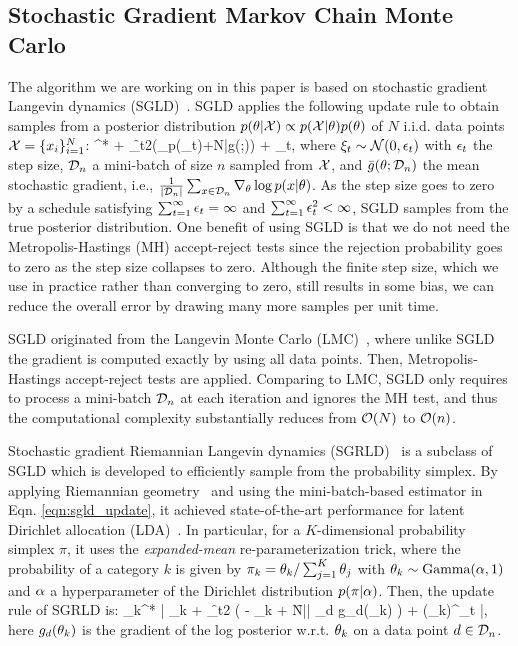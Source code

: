 \subsection{Stochastic Gradient Markov Chain Monte Carlo}
The algorithm we are working on in this paper is based on stochastic gradient Langevin dynamics (SGLD)~\cite{welling2011bayesian}. SGLD applies the following update rule to obtain samples from a posterior distribution $p(\ta|\cX) \propto p(\cX|\ta) p(\ta)$ of $N$ i.i.d. data points $\cX=\{x_i\}_{i=1}^{N}$:
\bea
\ta^* \law \ta + \f{\epsilon_t}{2}\left(\nabla_{\ta}\log p(\ta_t)+N\bar{g}(\ta;\SGLDMinibatch)\right) + \xi_t, \label{eqn:sgld_update}
\eea
where $\xi_t \sim \cN(0,\epsilon_t )$ with $\epsilon_t$ the step size, $\SGLDMinibatch$ a mini-batch of size $n$ sampled from $\cX$, and $\bar{g}(\ta;\SGLDMinibatch)$ the mean stochastic gradient, i.e., $\frac{1}{|\SGLDMinibatch|}\sum_{x\in \SGLDMinibatch}^{}\grad_{\ta} \log p(x|\ta)$. As the step size goes to zero by a schedule satisfying $\sum_{t=1}^{\infty}\epsilon_t = \infty$ and $\sum_{t=1}^{\infty}\epsilon_t^2 < \infty$, SGLD samples from the true posterior distribution. One benefit of using SGLD is that we do not need the Metropolis-Hastings (MH) accept-reject tests since the rejection probability goes to zero as the step size collapses to zero. Although the finite step size, which we use in practice rather than converging to zero, still results in some bias, we can reduce the overall error by drawing many more samples per unit time. 

SGLD originated from the Langevin Monte Carlo (LMC)~\cite{girolami2011riemann}, where unlike SGLD the gradient is computed exactly by using all data points. Then, Metropolis-Hastings accept-reject tests are applied. Comparing to LMC, SGLD only requires to process a mini-batch $\SGLDMinibatch$ at each iteration and ignores the MH test, and thus the computational complexity substantially reduces from $\cO(N)$ to $\cO(n)$.   

Stochastic gradient Riemannian Langevin dynamics (SGRLD)~\cite{patterson2013stochastic} is a subclass of SGLD which is developed to efficiently sample from the probability simplex. By applying Riemannian geometry~\cite{girolami2011riemann} and using the mini-batch-based estimator in Eqn. \ref{eqn:sgld_update}, it achieved state-of-the-art performance for latent Dirichlet allocation (LDA)~\cite{blei2003latent}. In particular, for a $K$-dimensional probability simplex $\pi$, it uses the \textit{expanded-mean} re-parameterization trick, where the probability of a category $k$ is given by $\pi_k = \theta_k / \sum_{j=1}^K \theta_j$ with $\theta_k \sim \text{Gamma}(\alpha,1)$ and $\alpha$ a hyperparameter of the Dirichlet distribution $p(\pi | \alpha )$. Then, the update rule of SGRLD is:
\bea
\ta_{k}^* \law \left| \ta_{k} + \f{\ep_t}{2} \left( \al - \ta_{k} + \f{N}{|\SGLDMinibatch|} \sum_{d \in \SGLDMinibatch} g_d(\ta_{k}) \right) + (\ta_{k})^\ha \xi_{t} \right|, \label{eqn:sgrld_update}
\eea
here $g_d(\theta_{k})$ is the gradient of the log posterior w.r.t. $\theta_{k}$ on a data point $d\in \SGLDMinibatch$.


